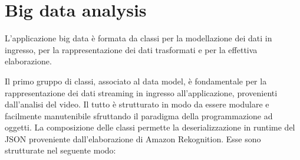 \section{Big data analysis}
L’applicazione big data è formata da classi per la modellazione dei dati in ingresso, per la rappresentazione dei dati trasformati e per la effettiva elaborazione. %

Il primo gruppo di classi, associato al data model, è fondamentale per la rappresentazione dei dati streaming in ingresso all’applicazione, provenienti dall’analisi del video. Il tutto è strutturato in modo da essere modulare e facilmente manutenibile sfruttando il paradigma della programmazione ad oggetti. La composizione delle classi permette la deserializzazione in runtime del JSON proveniente dall’elaborazione di Amazon Rekognition. %
Esse sono strutturate nel seguente modo:

